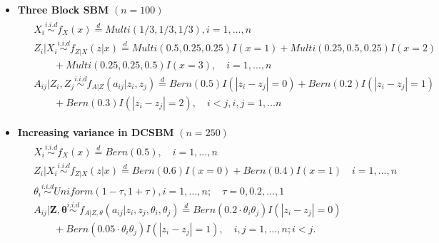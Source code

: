 \documentclass[11pt]{article}
\theoremstyle{definition}
\begin{document}
\begin{itemize}	
	\item \textbf{Three Block SBM} $(n = 100)$
	\vspace*{-0.5cm}
	\begin{equation}
	\label{eq:Three}
	\begin{gathered}
	\begin{aligned}
	&  X_{i} \overset{i.i.d}{\sim} f_{X}(x)   \stackrel{d}{=}  Multi(1/3, 1/3, 1/3), i = 1, \ldots , n \\ 
	&  Z_{i} | X_{i}  \overset{i.i.d}{\sim}    f_{Z|X}(z|x)  \stackrel{d}{=}   Multi(0.5, 0.25, 0.25) I( x = 1 ) +   Multi(0.25, 0.5, 0.25) I (x = 2)  \qquad  \\ & \quad \quad + Multi(0.25, 0.25, 0.5)I(x = 3), \quad  i = 1,\ldots,n  \\
	&  A_{ij} | Z_{i}, Z_{j}   \overset{i.i.d}{\sim}   f_{A|Z}(a_{ij} | z_{i}, z_{j}) \stackrel{d}{=}  Bern(0.5) I ( |z_{i} - z_{j}| = 0 )  + Bern(0.2) I(|z_{i} - z_{j}| = 1) \\ & \quad \quad + Bern(0.3) I (|z_{i} - z_{j}| = 2),  \quad i < j, i,j=1, \ldots n 
	\end{aligned}
	\end{gathered}
	\end{equation}
	\vspace*{-1.5cm}
	\item \textbf{Increasing variance in DCSBM} $(n = 250)$
	\vspace*{-0.5cm}
	\begin{equation}
	\label{eq:dcVariance}
	\begin{gathered}
	\begin{aligned}
	&  X_{i} \overset{i.i.d}{\sim} f_{X}(x)   \stackrel{d}{=}  Bern(0.5), \quad i = 1, \ldots , n \\ 
	&  Z_{i} | X_{i}  \overset{i.i.d}{\sim}    f_{Z|X}(z|x)  \stackrel{d}{=}   Bern(0.6) I( x = 0 ) + Bern(0.4) I (x = 1) \quad  i = 1,\ldots,n  \\
	& \theta_{i} \overset{i.i.d}{\sim} Uniform(1 - \tau, 1 + \tau), i = 1, \ldots, n; \quad \tau = 0, 0.2, \ldots, 1\\ 
	& A_{ij} | \mathbf{Z}, \mathbf{\theta}   \overset{i.i.d}{\sim}   f_{A|Z, \theta}(a_{ij} | z_{i}, z_{j}, \theta_{i}, \theta_{j}) \stackrel{d}{=} Bern(0.2 \cdot \theta_{i}\theta_{j}) I ( |z_{i} - z_{j}| = 0 ) \\ & \quad \quad + Bern(0.05 \cdot \theta_{i} \theta_{j} ) I(|z_{i} - z_{j}| = 1), \quad i,j=1, \ldots, n; i < j. 
	\end{aligned}
	\end{gathered}
	\end{equation}
	
\end{itemize}
\end{document}
